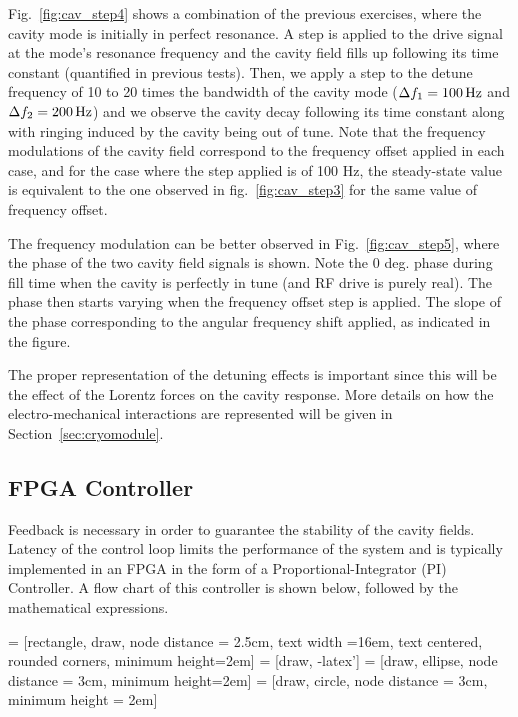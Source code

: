 \documentclass[a4paper,12pt]{article}
\begin{document}
Fig.~\ref{fig:cav_step4} shows a combination of the previous exercises, where the cavity mode is initially in perfect resonance. A step is applied to the drive signal at the mode's resonance frequency and the cavity field fills up following its time constant (quantified in previous tests). Then, we apply a step to the detune frequency of 10 to 20 times the bandwidth of the cavity mode ($\Delta f_1=100\,\rm Hz$ and $\Delta f_2=200\,\rm Hz$) and we observe the cavity decay following its time constant along with ringing induced by the cavity being out of tune. Note that the frequency modulations of the cavity field correspond to the frequency offset applied in each case, and for the case where the step applied is of 100 Hz, the steady-state value is equivalent to the one observed in fig.~\ref{fig:cav_step3} for the same value of frequency offset.

The frequency modulation can be better observed in Fig.~\ref{fig:cav_step5}, where the phase of the two cavity field signals is shown. Note the 0 deg. phase during fill time when the cavity is perfectly in tune (and RF drive is purely real). The phase then starts varying when the frequency offset step is applied. The slope of the phase corresponding to the angular frequency shift applied, as indicated in the figure.

The proper representation of the detuning effects is important since this will be the effect of the Lorentz forces on the cavity response. More details on how the electro-mechanical interactions are represented will be given in Section~\ref{sec:cryomodule}.

\subsection{FPGA Controller}

Feedback is necessary in order to guarantee the stability of the cavity fields. Latency of the control loop limits the performance of the system and is typically implemented in an FPGA in the form of a Proportional-Integrator (PI) Controller. A flow chart of this controller is shown below, followed by the mathematical expressions.

 = [rectangle, draw, node distance = 2.5cm, text width =16em, text centered, rounded corners, minimum height=2em]
 = [draw, -latex']
 = [draw, ellipse,  node distance = 3cm, minimum height=2em]
 = [draw, circle, node distance = 3cm, minimum height = 2em]
\end{document}

